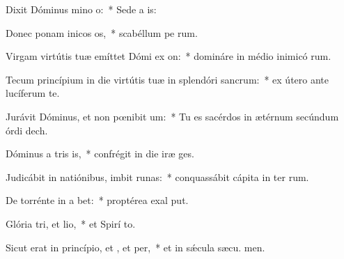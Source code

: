 \item Dixit Dóminus mino o:~* Sede a  is:
\item Donec ponam inicos os,~* scabéllum pe rum.
\item Virgam virtútis tuæ emíttet Dómi ex on:~* domináre in médio inimicó rum.
\item Tecum princípium in die virtútis tuæ in splendóri sancrum:~* ex útero ante lucíferum  te.
\item Jurávit Dóminus, et non pœnibit um:~* Tu es sacérdos in ætérnum secúndum órdi dech.
\item Dóminus a tris is,~* confrégit in die iræ  ges.
\item Judicábit in natiónibus, imbit runas:~* conquassábit cápita in ter rum.
\item De torrénte in a bet:~* proptérea exal put.
\item Glória tri, et lio,~* et Spirí to.
\item Sicut erat in princípio, et , et per,~* et in sǽcula sæcu. men.
